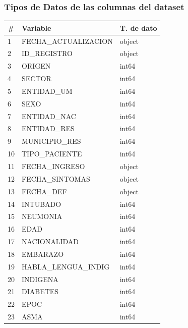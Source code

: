 \subsubsection{Tipos de Datos de las columnas del dataset}

\begin{table}[h]
\resizebox{7.5cm}{!} {

\begin{tabular}{|l|l|l|}
\hline
\# & Variable                & T. de dato \\ \hline
1  & FECHA\_ACTUALIZACION    & object     \\ \hline
2  & ID\_REGISTRO            & object     \\ \hline
3  & ORIGEN                  & int64      \\ \hline
4  & SECTOR                  & int64      \\ \hline
5  & ENTIDAD\_UM             & int64      \\ \hline
6  & SEXO                    & int64      \\ \hline
7  & ENTIDAD\_NAC            & int64      \\ \hline
8  & ENTIDAD\_RES            & int64      \\ \hline
9  & MUNICIPIO\_RES          & int64      \\ \hline
10 & TIPO\_PACIENTE          & int64      \\ \hline
11 & FECHA\_INGRESO          & object     \\ \hline
12 & FECHA\_SINTOMAS         & object     \\ \hline
13 & FECHA\_DEF              & object     \\ \hline
14 & INTUBADO                & int64      \\ \hline
15 & NEUMONIA                & int64      \\ \hline
16 & EDAD                    & int64      \\ \hline
17 & NACIONALIDAD            & int64      \\ \hline
18 & EMBARAZO                & int64      \\ \hline
19 & HABLA\_LENGUA\_INDIG    & int64      \\ \hline
20 & INDIGENA                & int64      \\ \hline
21 & DIABETES                & int64      \\ \hline
22 & EPOC                    & int64      \\ \hline
23 & ASMA                    & int64      \\ \hline

\end{tabular}}
\end{table}
